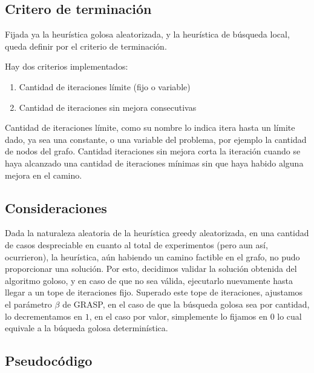 \subsection{Critero de terminaci\'on}

Fijada ya la heur\'istica golosa aleatorizada, y la heur\'istica de b\'usqueda local, queda definir por el criterio de terminaci\'on.

\vspace{2mm}

Hay dos criterios implementados:

\begin{enumerate}
\item Cantidad de iteraciones l\'imite (fijo o variable)
\item Cantidad de iteraciones sin mejora consecutivas
\end{enumerate}

Cantidad de iteraciones l\'imite, como su nombre lo indica itera hasta un l\'imite dado, ya sea una constante, o una variable del problema, por ejemplo la cantidad de nodos del grafo. Cantidad iteraciones sin mejora corta la iteraci\'on cuando se haya alcanzado una cantidad de iteraciones m\'inimas sin que haya habido alguna mejora en el camino.

\vspace{2mm}

\subsection{Consideraciones}

Dada la naturaleza aleatoria de la heur\'istica greedy aleatorizada, en una cantidad de casos despreciable en cuanto al total de experimentos (pero aun as\'i, ocurrieron), la heur\'istica, a\'un habiendo un camino factible en el grafo, no pudo proporcionar una soluci\'on. Por esto, decidimos validar la soluci\'on obtenida del algoritmo goloso, y en caso de que no sea v\'alida, ejecutarlo nuevamente hasta llegar a un tope de iteraciones fijo. Superado este tope de iteraciones, ajustamos el par\'ametro $\beta$ de GRASP, en el caso de que la b\'usqueda golosa sea por cantidad, lo decrementamos en $1$, en el caso por valor, simplemente lo fijamos en $0$ lo cual equivale a la b\'uqueda golosa determin\'istica.

\subsection{Pseudoc\'odigo}

